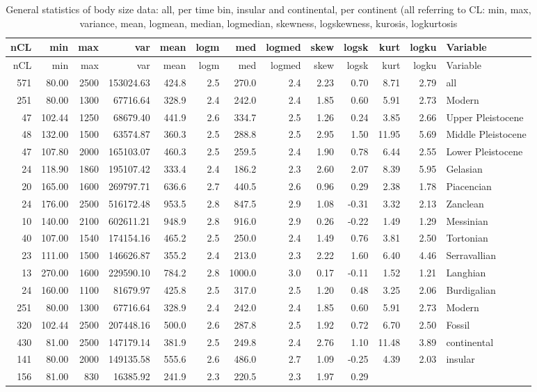 \documentclass[]{article}
\begin{document}
\begin{longtable}[]{@{}rrrrrrrrrrrrl@{}}
\caption{General statistics of body size data: all, per time bin,
insular and continental, per continent (all referring to CL: min, max,
variance, mean, logmean, median, logmedian, skewness, logskewness,
kurosis, logkurtosis}\tabularnewline
\toprule
nCL & min & max & var & mean & logm & med & logmed & skew & logsk & kurt
& logku & Variable\tabularnewline
\midrule
\endfirsthead
\toprule
nCL & min & max & var & mean & logm & med & logmed & skew & logsk & kurt
& logku & Variable\tabularnewline
\midrule
\endhead
571 & 80.00 & 2500 & 153024.63 & 424.8 & 2.5 & 270.0 & 2.4 & 2.23 & 0.70
& 8.71 & 2.79 & all\tabularnewline
251 & 80.00 & 1300 & 67716.64 & 328.9 & 2.4 & 242.0 & 2.4 & 1.85 & 0.60
& 5.91 & 2.73 & Modern\tabularnewline
47 & 102.44 & 1250 & 68679.40 & 441.9 & 2.6 & 334.7 & 2.5 & 1.26 & 0.24
& 3.85 & 2.66 & Upper Pleistocene\tabularnewline
48 & 132.00 & 1500 & 63574.87 & 360.3 & 2.5 & 288.8 & 2.5 & 2.95 & 1.50
& 11.95 & 5.69 & Middle Pleistocene\tabularnewline
47 & 107.80 & 2000 & 165103.07 & 460.3 & 2.5 & 259.5 & 2.4 & 1.90 & 0.78
& 6.44 & 2.55 & Lower Pleistocene\tabularnewline
24 & 118.90 & 1860 & 195107.42 & 333.4 & 2.4 & 186.2 & 2.3 & 2.60 & 2.07
& 8.39 & 5.95 & Gelasian\tabularnewline
20 & 165.00 & 1600 & 269797.71 & 636.6 & 2.7 & 440.5 & 2.6 & 0.96 & 0.29
& 2.38 & 1.78 & Piacencian\tabularnewline
24 & 176.00 & 2500 & 516172.48 & 953.5 & 2.8 & 847.5 & 2.9 & 1.08 &
-0.31 & 3.32 & 2.13 & Zanclean\tabularnewline
10 & 140.00 & 2100 & 602611.21 & 948.9 & 2.8 & 916.0 & 2.9 & 0.26 &
-0.22 & 1.49 & 1.29 & Messinian\tabularnewline
40 & 107.00 & 1540 & 174154.16 & 465.2 & 2.5 & 250.0 & 2.4 & 1.49 & 0.76
& 3.81 & 2.50 & Tortonian\tabularnewline
23 & 111.00 & 1500 & 146626.87 & 355.2 & 2.4 & 213.0 & 2.3 & 2.22 & 1.60
& 6.40 & 4.46 & Serravallian\tabularnewline
13 & 270.00 & 1600 & 229590.10 & 784.2 & 2.8 & 1000.0 & 3.0 & 0.17 &
-0.11 & 1.52 & 1.21 & Langhian\tabularnewline
24 & 160.00 & 1100 & 81679.97 & 425.8 & 2.5 & 317.0 & 2.5 & 1.20 & 0.48
& 3.25 & 2.06 & Burdigalian\tabularnewline
251 & 80.00 & 1300 & 67716.64 & 328.9 & 2.4 & 242.0 & 2.4 & 1.85 & 0.60
& 5.91 & 2.73 & Modern\tabularnewline
320 & 102.44 & 2500 & 207448.16 & 500.0 & 2.6 & 287.8 & 2.5 & 1.92 &
0.72 & 6.70 & 2.50 & Fossil\tabularnewline
430 & 81.00 & 2500 & 147179.14 & 381.9 & 2.5 & 249.8 & 2.4 & 2.76 & 1.10
& 11.48 & 3.89 & continental\tabularnewline
141 & 80.00 & 2000 & 149135.58 & 555.6 & 2.6 & 486.0 & 2.7 & 1.09 &
-0.25 & 4.39 & 2.03 & insular\tabularnewline
156 & 81.00 & 830 & 16385.92 & 241.9 & 2.3 & 220.5 & 2.3 & 1.97 & 0.29 &

\end{longtable}
\end{document}
